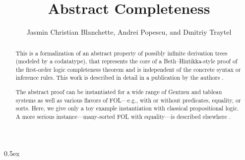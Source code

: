 \documentclass[11pt,a4paper]{article}
\begin{document}
\title{Abstract Completeness}
\author{Jasmin Christian Blanchette, Andrei Popescu, and Dmitriy Traytel}

\maketitle

\begin{abstract}
  This is a formalization of an abstract property of possibly infinite
  derivation trees (modeled by a codatatype), that represents the core of a
  Beth--Hintikka-style proof of the first-order logic completeness theorem and
  is independent of the concrete syntax or inference rules. This work is
  described in detail in a publication by the authors \cite{bla-compl}.

  The abstract proof can be instantiated for a wide range of Gentzen and tableau
  systems as well as various flavors of FOL---e.g., with or without predicates,
  equality, or sorts. Here, we give only a toy example instantiation with
  classical propositional logic. A more serious instance---many-sorted FOL with
  equality---is described elsewhere \cite{bla-mech}.
\end{abstract}




\tableofcontents

\parindent 0pt\parskip 0.5ex



%
%
\end{document}
